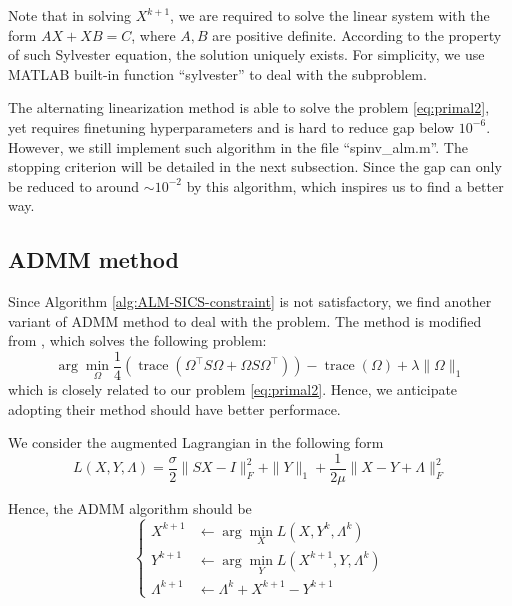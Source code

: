 \documentclass[conference,onecolumn,12pt]{IEEEtran}
\newcommand\tr{{{\operatorname{trace}}}}
\newcommand{\<}{\langle}
\renewcommand{\>}{\rangle}
\numberwithin{equation}{section}
\begin{document}
Note that in solving $X^{k+1}$, we are required to solve the linear system with the form $AX+XB=C$, where $A,B$ are positive definite. According to the property of such Sylvester equation, the solution uniquely exists. For simplicity, we use MATLAB built-in function ``sylvester'' to deal with the subproblem.

The alternating linearization method is able to solve the problem \ref{eq:primal2}, yet requires finetuning hyperparameters and is hard to reduce gap below $10^{-6}$. However, we still implement such algorithm in the file ``spinv\_alm.m''. The stopping criterion will be detailed in the next subsection. Since the gap can only be reduced to around $\sim 10^{-2}$ by this algorithm, which inspires us to find a better way.

\subsection{ADMM method}
Since Algorithm \ref{alg:ALM-SICS-constraint} is not satisfactory, we find another variant of ADMM method to deal with the problem. The method is modified from \cite{wang2020efficient}, which solves the following problem:
\begin{equation*}
    \arg\min_\Omega \frac{1}{4}(\tr(\Omega^\top S\Omega+\Omega S\Omega^\top))-\tr(\Omega)+\lambda\|\Omega\|_1
\end{equation*}
which is closely related to our problem \ref{eq:primal2}. Hence, we anticipate adopting their method should have better performace. 

We consider the augmented Lagrangian in the following form
\begin{equation}
    L(X,Y,\Lambda)=\frac{\sigma}{2}\|SX-I\|_F^2+\|Y\|_1+\frac{1}{2\mu}\|X-Y+\Lambda\|_F^2
\end{equation}

Hence, the ADMM algorithm should be
\begin{equation}
    \begin{cases}
        X^{k+1}&\gets\arg\min_X L(X,Y^k,\Lambda^k)\\
        Y^{k+1}&\gets\arg\min_Y L(X^{k+1},Y,\Lambda^k)\\
        \Lambda^{k+1}&\gets\Lambda^k+X^{k+1}-Y^{k+1}
    \end{cases}
\end{equation}
\end{document}
